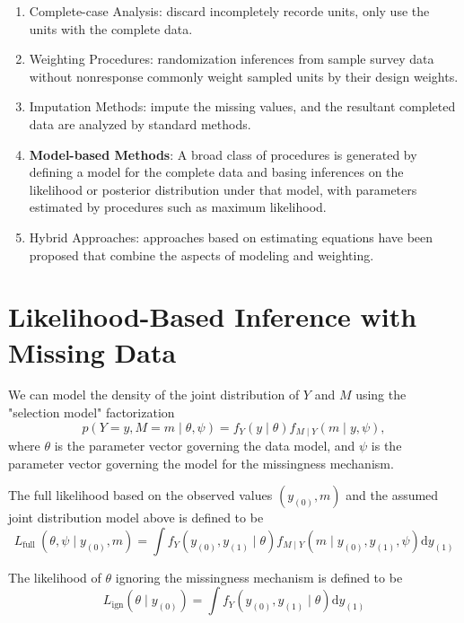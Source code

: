 \begin{enumerate}
	\item Complete-case Analysis: discard incompletely recorde units, only use the units with the complete data.
	\item Weighting Procedures: randomization inferences from sample survey data without nonresponse commonly weight sampled units by their design weights.
	\item Imputation Methods: impute the missing values, and the resultant completed data are analyzed by standard methods.
	\item \textbf{Model-based Methods}: A broad class of procedures is generated by defining a model for the complete data and basing inferences on the likelihood or posterior distribution under that model, with parameters estimated by procedures such as maximum likelihood.
	\item Hybrid Approaches: approaches based on estimating equations have been
	      proposed that combine the aspects of modeling and weighting.
\end{enumerate}

\section{Likelihood-Based Inference with Missing Data}

We can model the density of the joint distribution of $Y$ and $M$ using the "selection model" factorization
\begin{equation*}
	p(Y=y,M=m\mid\theta,\psi)=f_{Y}(y\mid\theta)f_{M\mid Y}(m\mid y,\psi),
\end{equation*}
where $\theta$ is the parameter vector governing the data model, and $\psi$ is the parameter vector governing the model for the missingness mechanism.

The full likelihood based on the observed values $\left(y_{(0)}, m\right)$ and the assumed joint distribution model above is defined to be
\begin{equation}
	L_{\text {full }}\left(\theta, \psi \mid y_{(0)}, m\right)=\int f_{Y}\left(y_{(0)}, y_{(1)} \mid \theta\right) f_{M \mid Y}\left(m \mid y_{(0)}, y_{(1)}, \psi\right) \mathrm{d} y_{(1)}
\end{equation}

The likelihood of $\theta$ ignoring the missingness mechanism is defined to be
\begin{equation}
	L_{\mathrm{ign}}\left(\theta \mid y_{(0)}\right)=\int f_{Y}\left(y_{(0)}, y_{(1)} \mid \theta\right) \mathrm{d} y_{(1)}
\end{equation}

